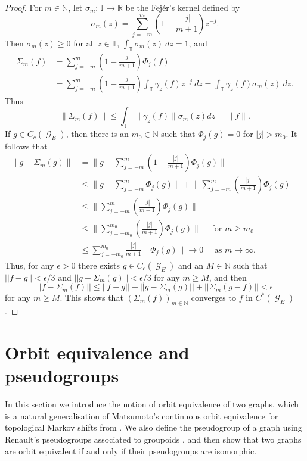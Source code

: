 \documentclass[12pt, a4paper]{amsart}
\numberwithin{equation}{section}
\theoremstyle{definition}
\theoremstyle{remark}
\begin{document}
\begin{proof}
	For $m\in{\mathbb{N}}$, let $\sigma_m:{\mathbb{T}}\to{\mathbb{R}}$ be the Fej\'er's kernel defined by 
\[ 
\sigma_m(z)=\sum_{j=-m}^m(1-\frac{|j|}{m+1})z^{-j}.
\]
Then $\sigma_m(z)\ge 0$ for all $z\in{\mathbb{T}}$, $\int_{\mathbb{T}}\sigma_m(z)\ dz=1$, and 
	\begin{align*}
		\Sigma_m(f)&=\sum_{j=-m}^m\left(1-\frac{|j|}{m+1}\right)\Phi_j(f)\\
		&=\sum_{j=-m}^m\left(1-\frac{|j|}{m+1}\right)\int_{\mathbb{T}}\gamma_z(f)z^{-j}\ dz
		=\int_{\mathbb{T}}\gamma_z(f)\sigma_m(z)\ dz.
	\end{align*}
	Thus
	\begin{equation*}
		\|\Sigma_m(f)\|\le\int_{\mathbb{T}}\|\gamma_z(f)\|\sigma_m(z) dz =\|f\|.
	\end{equation*}
	If $g\in C_c({\operatorname{\mathcal{G}}}_E)$, then there is an $m_0\in{\mathbb{N}}$ such that $\Phi_j(g)=0$ for $|j|>m_0$. It follows that 
	\begin{align*}
		\|g-\Sigma_m(g)\|&=\Big\|g-\sum_{j=-m}^m\left(1-\frac{|j|}{m+1}\right)\Phi_j(g)\Big\| \\
		&\leq \Big\|g-\sum_{j=-m}^m \Phi_j(g)\Big\|+\Big\|\sum_{j=-m}^m\left(\frac{|j|}{m+1}\right)\Phi_j(g)\Big\| \\
		&\leq \Big\|\sum_{j=-m}^m\left(\frac{|j|}{m+1}\right)\Phi_j(g)\Big\| \\
		&\leq \Big\|\sum_{j=-m_0}^{m_0}\left(\frac{|j|}{m+1}\right)\Phi_j(g)\Big\| \quad \text{ for } m \geq m_0 \\
		&\le\sum_{j=-m_0}^{m_0}\frac{|j|}{m+1}\|\Phi_j(g)\|\to 0 \quad \text{ as $m\to\infty$.}
	\end{align*}
Thus, for any $\epsilon>0$ there exists $g\in C_c({\operatorname{\mathcal{G}}}_E)$ and an $M\in{\mathbb{N}}$ such that $||f-g||<\epsilon/3$ and $||g-\Sigma_m(g)||<\epsilon/3$ for any $m\ge M$, and then 
	\begin{equation*}
		||f-\Sigma_m(f)||\le ||f-g||+||g-\Sigma_m(g)||+||\Sigma_m(g-f)||<\epsilon
	\end{equation*}
	for any $m\ge M$. This shows that $(\Sigma_m(f))_{m\in{\mathbb{N}}}$ converges to $f$ in $C^*({\operatorname{\mathcal{G}}}_E)$.
\end{proof}

\section{Orbit equivalence and pseudogroups}\label{sec: oe and pseudo}

In this section we introduce the notion of orbit equivalence of two graphs, which is a natural generalisation of  Matsumoto's 
continuous orbit equivalence for topological Markov shifts from \cite{Mat}. We also define the pseudogroup of a graph using Renault's pseudogroups 
associated to groupoids \cite{Ren2}, and then show that two graphs are orbit 
equivalent if and only if their pseudogroups are isomorphic. 
\end{document}
